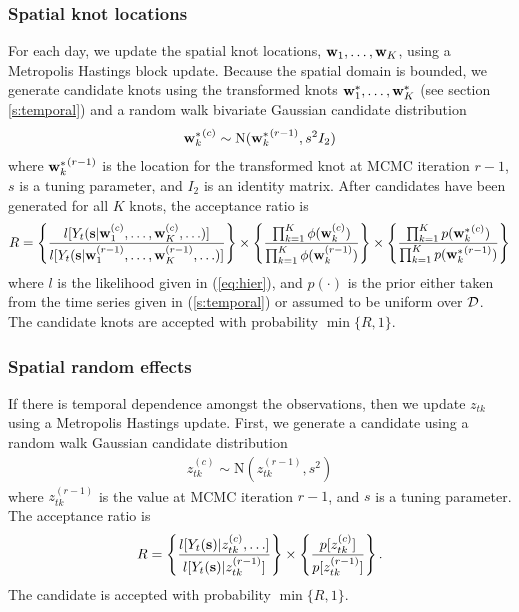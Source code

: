 \documentclass[11pt]{article}
\begin{document}
\subsubsection*{Spatial knot locations}
For each day, we update the spatial knot locations, $\mbox{\bf w}_1, \ldots, \mbox{\bf w}_K$, using a Metropolis Hastings block update.
Because the spatial domain is bounded, we generate candidate knots using the transformed knots $\mbox{\bf w}^*_1, \ldots, \mbox{\bf w}^*_K$ (see section \ref{s:temporal}) and a random walk bivariate Gaussian candidate distribution
\begin{align*}
	{ \mbox{\bf w}^*_k}^{(c)} \sim \text{N}({\mbox{\bf w}^*_k}^{(r - 1)}, s^2 I_2)
\end{align*}
where ${\mbox{\bf w}^*_k}^{(r - 1)}$ is the location for the transformed knot at MCMC iteration $r - 1$, $s$ is a tuning parameter, and $I_2$ is an identity matrix.
After candidates have been generated for all $K$ knots, the acceptance ratio is
\begin{align*}
  R = \left\{ \frac{ l[ Y_t(\mbox{\bf s} | \mbox{\bf w}_1^{(c)}, \ldots, \mbox{\bf w}_K^{(c)}, \ldots)] }{l[ Y_t(\mbox{\bf s} | \mbox{\bf w}_1^{(r - 1)}, \ldots, \mbox{\bf w}_K^{(r - 1)}, \ldots)]} \right\} \times \left\{ \frac{ \prod_{k = 1}^{K}\phi(\mbox{\bf w}_k^{(c)})}{ \prod_{k = 1}^{K}\phi(\mbox{\bf w}_k^{(r - 1)})} \right\} \times \left\{ \frac{ \prod_{k = 1}^{K} p({\mbox{\bf w}^*_k}^{(c)})}{ \prod_{k = 1}^{K} p({\mbox{\bf w}^*_k}^{(r - 1)})}\right\}
\end{align*}
where $l$ is the likelihood given in (\ref{eq:hier}), and $p(\cdot)$ is the prior either taken from the time series given in (\ref{s:temporal}) or assumed to be uniform over ${\cal D}$.
The candidate knots are accepted with probability $\min\{R, 1\}$.

\subsubsection*{Spatial random effects}
If there is temporal dependence amongst the observations, then we update $z_{tk}$ using a Metropolis Hastings update.
First, we generate a candidate using a random walk Gaussian candidate distribution
\begin{align*}
  z_{tk}^{(c)} \sim \text{N}(z_{tk}^{(r - 1)}, s^2)
\end{align*}
where $z_{tk}^{(r-1)}$ is the value at MCMC iteration $r - 1$, and $s$ is a tuning parameter.
The acceptance ratio is
\begin{align*}
  R = \left\{ \frac{ l[Y_t(\mbox{\bf s}) | z_{tk}^{(c)}, \ldots] }{ l[Y_t(\mbox{\bf s}) | z_{tk}^{(r - 1)}]} \right\} \times \left\{ \frac{ p[ z_{tk}^{(c)} ] }{ p[ z_{tk}^{(r - 1)}]}\right\}.
\end{align*}
The candidate is accepted with probability $\min\{R, 1\}$.
\end{document}
